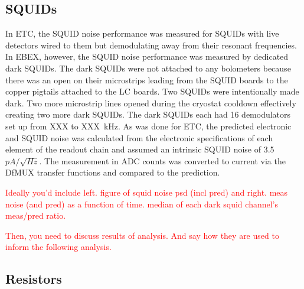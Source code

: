 

\subsection{SQUIDs}
\label{sec:squid_noise}

In \ac{ETC}, the \ac{SQUID} noise performance was measured for \ac{SQUID}s with live detectors wired to them but demodulating away from their resonant frequencies. 
In \ac{EBEX}, however, the \ac{SQUID} noise performance was measured by dedicated dark \ac{SQUID}s. 
The dark \ac{SQUID}s were not attached to any bolometers because there was an open on their microstrips leading from the \ac{SQUID} boards to the copper pigtails attached to the \ac{LC} boards. 
Two \ac{SQUID}s were intentionally made dark. 
Two more microstrip lines opened during the cryostat cooldown effectively creating two more dark \ac{SQUID}s. 
The dark \ac{SQUID}s each had 16 demodulators set up from XXX to XXX~kHz.
As was done for \ac{ETC}, the predicted electronic and \ac{SQUID} noise was calculated from the electronic specifications of each element of the readout chain and assumed an intrinsic \ac{SQUID} noise of 3.5~$pA/\sqrt{Hz}$. 
The measurement in \ac{ADC} counts was converted to current via the \ac{DfMUX} transfer functions and compared to the prediction. 



\textcolor{red}{
Ideally you'd include
left. figure of squid noise psd (incl pred) and right. meas noise (and pred) as a function of time.
median of each dark squid channel's meas/pred ratio.
}

\textcolor{red}{Then, you need to discuss results of analysis. And say how they are used to inform the following analysis.}

\subsection{Resistors}
\label{sec:resistor_noise}

